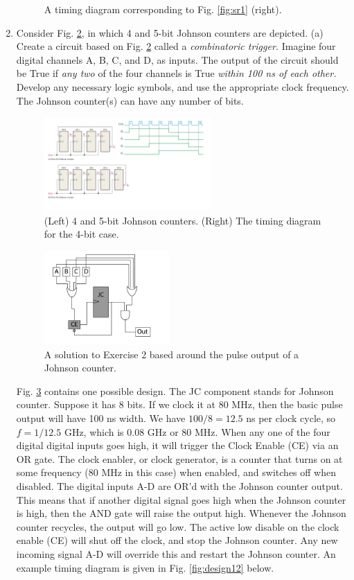 \documentclass[10pt]{article}
\begin{document}
\begin{enumerate}
\begin{figure}[ht]
\caption{\label{fig:sr2} A timing diagram corresponding to Fig. \ref{fig:sr1} (right).}
\end{figure}
\item Consider Fig. \ref{fig:SRG8}, in which 4 and 5-bit Johnson counters are depicted.  (a) Create a circuit based on Fig. \ref{fig:SRG8} called a \textit{combinatoric trigger.}  Imagine four digital channels A, B, C, and D, as inputs.  The output of the circuit should be True if \textit{any two} of the four channels is True \textit{within 100 ns of each other.}  Develop any necessary logic symbols, and use the appropriate clock frequency.  The Johnson counter(s) can have any number of bits.
\begin{figure}[hb]
\centering
\includegraphics[width=0.6\textwidth]{figures/SRG8.pdf}
\caption{\label{fig:SRG8} (Left) 4 and 5-bit Johnson counters. (Right) The timing diagram for the 4-bit case.}
\end{figure}
\begin{figure}
\centering
\includegraphics[width=0.45\textwidth]{figures/design11.pdf}
\caption{\label{fig:design11} A solution to Exercise 2 based around the pulse output of a Johnson counter.}
\end{figure}
Fig. \ref{fig:design11} contains one possible design.  The JC component stands for Johnson counter.  Suppose it has 8 bits.  If we clock it at 80 MHz, then the basic pulse output will have 100 ns width.  We have $100/8 = 12.5$ ns per clock cycle, so $f = 1/12.5$ GHz, which is $0.08$ GHz or 80 MHz.  When any one of the four digital digital inputs goes high, it will trigger the Clock Enable (CE) via an OR gate.  The clock enabler, or clock generator, is a counter that turns on at some frequency (80 MHz in this case) when enabled, and switches off when disabled.  The digital inputs A-D are OR'd with the Johnson counter output.  This means that if another digital signal goes high when the Johnson counter is high, then the AND gate will raise the output high.  Whenever the Johnson counter recycles, the output will go low.  The active low disable on the clock enable (CE) will shut off the clock, and stop the Johnson counter.  Any new incoming signal A-D will override this and restart the Johnson counter.  An example timing diagram is given in Fig. \ref{fig:design12} below.

\end{enumerate}
\end{document}
